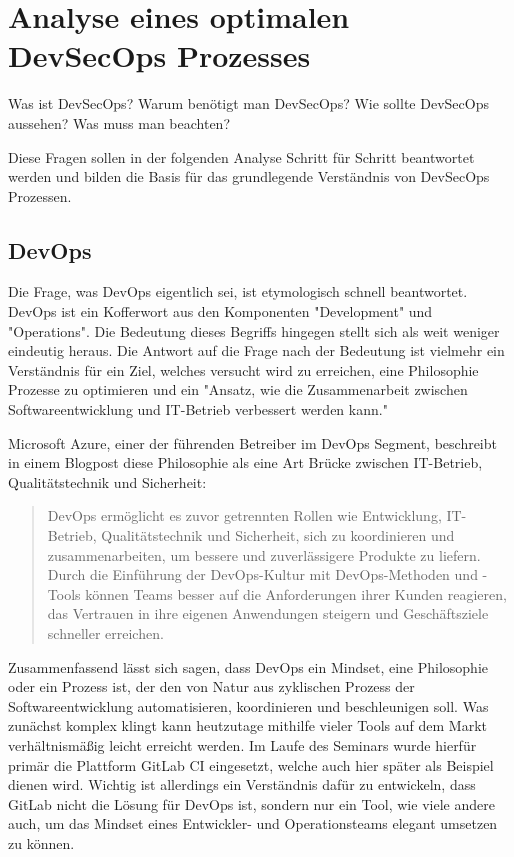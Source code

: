 \section{Analyse eines optimalen DevSecOps Prozesses}\label{sec:analysisDevSecOps}
Was ist DevSecOps?
Warum benötigt man DevSecOps?
Wie sollte DevSecOps aussehen?
Was muss man beachten?

Diese Fragen sollen in der folgenden Analyse Schritt für Schritt beantwortet werden und bilden die Basis für das grundlegende Verständnis von DevSecOps Prozessen.

\subsection{DevOps}
Die Frage, was DevOps eigentlich sei, ist etymologisch schnell beantwortet.
DevOps ist ein Kofferwort aus den Komponenten "Development" und "Operations".
Die Bedeutung dieses Begriffs hingegen stellt sich als weit weniger eindeutig heraus.
Die Antwort auf die Frage nach der Bedeutung ist vielmehr ein Verständnis für ein Ziel, welches versucht wird zu erreichen, eine Philosophie Prozesse zu optimieren und ein "Ansatz, wie die Zusammenarbeit zwischen Softwareentwicklung und IT-Betrieb verbessert werden kann."\cite{DevOps2021}

Microsoft Azure, einer der führenden Betreiber im DevOps Segment, beschreibt in einem Blogpost diese Philosophie als eine Art Brücke zwischen IT-Betrieb, Qualitätstechnik und Sicherheit\cite{WasIstDevOps}:
\blockquote{DevOps ermöglicht es zuvor getrennten Rollen wie Entwicklung, IT-Betrieb, Qualitätstechnik und Sicherheit, sich zu koordinieren und zusammenarbeiten, um bessere und zuverlässigere Produkte zu liefern. Durch die Einführung der DevOps-Kultur mit DevOps-Methoden und -Tools können Teams besser auf die Anforderungen ihrer Kunden reagieren, das Vertrauen in ihre eigenen Anwendungen steigern und Geschäftsziele schneller erreichen.}

Zusammenfassend lässt sich sagen, dass DevOps ein Mindset, eine Philosophie oder ein Prozess ist, der den von Natur aus zyklischen Prozess der Softwareentwicklung automatisieren, koordinieren und beschleunigen soll.
Was zunächst komplex klingt kann heutzutage mithilfe vieler Tools auf dem Markt verhältnismäßig leicht erreicht werden.
Im Laufe des Seminars wurde hierfür primär die Plattform GitLab CI eingesetzt, welche auch hier später als Beispiel dienen wird.
Wichtig ist allerdings ein Verständnis dafür zu entwickeln, dass GitLab nicht die Lösung für DevOps ist, sondern nur ein Tool, wie viele andere auch, um das Mindset eines Entwickler- und Operationsteams elegant umsetzen zu können.

